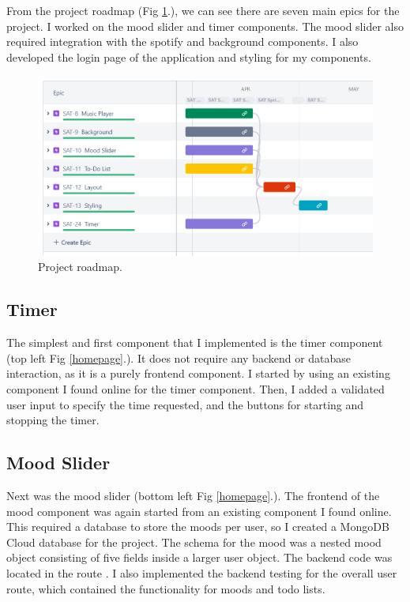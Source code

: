 \documentclass[conference]{IEEEtran}
\begin{document}
From the project roadmap (Fig \ref{roadmap}.), we can see there are seven main epics for the project. I worked on the mood slider and timer components. The mood slider also required integration with the spotify and background components. I also developed the login page of the application and styling for my components.

\begin{figure}[htbp]
\centerline{\includegraphics[width = \linewidth]{project-roadmap.png}}
\caption{Project roadmap.}
\label{roadmap}
\end{figure}

\subsection{Timer}
The simplest and first component that I implemented is the timer component (top left Fig \ref{homepage}.). It does not require any backend or database interaction, as it is a purely frontend component. I started by using an existing component I found online for the timer component. Then, I added a validated user input to specify the time requested, and the buttons for starting and stopping the timer.

\subsection{Mood Slider}
Next was the mood slider (bottom left Fig \ref{homepage}.). The frontend of the mood component was again started from an existing component I found online. This required a database to store the moods per user, so I created a MongoDB Cloud database for the project. The schema for the mood was a nested mood object consisting of five fields inside a larger user object. The backend code was located in the route . I also implemented the backend testing for the overall user route, which contained the functionality for moods and todo lists.
\end{document}
